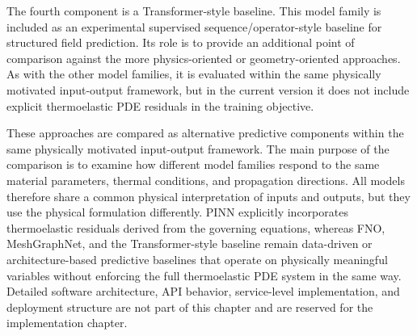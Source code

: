 The fourth component is a Transformer-style baseline. This model family is included as an experimental supervised sequence/operator-style baseline for structured field prediction. Its role is to provide an additional point of comparison against the more physics-oriented or geometry-oriented approaches. As with the other model families, it is evaluated within the same physically motivated input-output framework, but in the current version it does not include explicit thermoelastic PDE residuals in the training objective.

These approaches are compared as alternative predictive components within the same physically motivated input-output framework. The main purpose of the comparison is to examine how different model families respond to the same material parameters, thermal conditions, and propagation directions. All models therefore share a common physical interpretation of inputs and outputs, but they use the physical formulation differently. PINN explicitly incorporates thermoelastic residuals derived from the governing equations, whereas FNO, MeshGraphNet, and the Transformer-style baseline remain data-driven or architecture-based predictive baselines that operate on physically meaningful variables without enforcing the full thermoelastic PDE system in the same way. Detailed software architecture, API behavior, service-level implementation, and deployment structure are not part of this chapter and are reserved for the implementation chapter.
